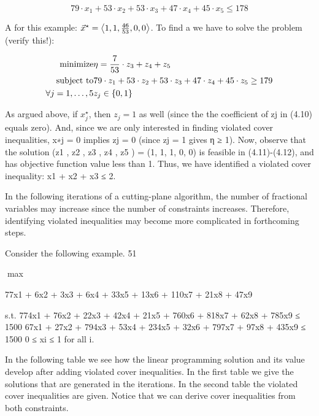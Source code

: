 \begin{example}
\begin{equation}
79\cdot x_1+53\cdot x_2+53\cdot x_3+47\cdot x_4+45\cdot x_5\leq178
\end{equation}

A  for this example: $\vec{x}^{\star}=\left\langle 1,1,\frac{46}{53},0,0 \right\rangle$. To find a  we have to solve the problem (verify this!):

\begin{eqnarray}
\mbox{minimize}&\eta=\frac{7}{53}\cdot z_3+z_4+z_5\eqnlab{sepco-ex-m}\\
\mbox{subject to}&79\cdot z_1+53\cdot z_2+53\cdot z_3+47\cdot z_4+45\cdot z_5\geq 179\eqnlab{sepco-ex-c1}\\
\forall\rangei[j]{1}{5}&z_j\in\accl{0,1}\eqnlab{sepco-ex-c2}
\end{eqnarray}

As argued above, if $x_j^{\star}$, then $z_j=1$ as well (since the the coefficient of zj in (4.10) equals zero). And,
since we are only interested in finding violated cover inequalities, x∗j = 0 implies zj = 0 (since zj = 1
gives η ≥ 1). Now, observe that the solution (z1 , z2 , z3 , z4 , z5 ) = (1, 1, 1, 0, 0) is feasible in (4.11)-(4.12),
and has objective function value less than 1. Thus, we have identified a violated cover inequality:
x1 + x2 + x3 ≤ 2.

In the following iterations of a cutting-plane algorithm, the number of fractional variables may increase
since the number of constraints increases. Therefore, identifying violated inequalities may become more
complicated in forthcoming steps.
\end{example}

Consider the following example.
51

max

77x1 + 6x2 + 3x3 + 6x4 + 33x5 + 13x6 + 110x7 + 21x8 + 47x9

s.t. 774x1 + 76x2 + 22x3 + 42x4 + 21x5 + 760x6 + 818x7 + 62x8 + 785x9 ≤ 1500
67x1 + 27x2 + 794x3 + 53x4 + 234x5 + 32x6 + 797x7 + 97x8 + 435x9 ≤ 1500
0 ≤ xi ≤ 1 for all i.

In the following table we see how the linear programming solution and its value develop after adding
violated cover inequalities. In the first table we give the solutions that are generated in the iterations.
In the second table the violated cover inequalities are given. Notice that we can derive cover inequalities
from both constraints.

